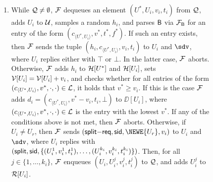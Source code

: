 \begin{figure*}[!t]
{{\begin{enumerate}
	
	\item While $\mathcal{Q} \neq \emptyset$, $\mathcal{F}$ dequeues an element $(U^*,U_i,v_i,t_i)$ from $\mathcal{Q}$, 
	adds $U_i$ to $\mathcal{U}$, samples a random $h_i$, and parses $\mathsf{B}$ via $\mathcal{F}_{\mathsf{B}}$ for an entry 
	of the form $(c_{\langle U^*,U_i \rangle}, v^*, t^*, f^*)$. If such an entry exists, then 
	$\mathcal{F}$ sends the tuple $(h_i, c_{\langle U^*,U_i \rangle}, v_i, t_i)$ to $U_i$ and $\sdv$, 
	where $U_i$ replies either with $\top$ or $\bot$.  In the latter case, $\mathcal{F}$ aborts. 
	Otherwise, $\mathcal{F}$ adds $h_i$ to $\mathcal{H}[U^*]$ and $\mathcal{H}[U_i]$, sets $\mathcal{V}[U_i] = \mathcal{V}[U_i] + v_i$, 
	and checks whether for all entries of the form $(c_{\langle U^*,U_i \rangle}, v^*, \cdot, 
	\cdot) \in \mathcal{L}$, it holds that $v^* \geq v_i$. If this is the case $\mathcal{F}$ adds 
	$d_i = (c_{\langle U^*,U_i \rangle},v^* - v_i, t_i, \bot)$ to $\DD[U_i]$, where 
	$(c_{\langle U^*,U_i \rangle}, v^*, \cdot, \cdot) \in \mathcal{L}$ is the entry with the lowest 
	$v^*$. If any of the conditions above is not met, then $\mathcal{F}$ aborts. Otherwise, if 
	$U_i \neq U_r$, then $\mathcal{F}$ sends $(\mathsf{split-}\mathsf{req}, \sid, \NEWE{U_r}, v_i)$ 
	to $U_i$ and $\sdv$, where $U_i$ replies with $(\mathsf{split}, \mathsf{sid}, \{(U_i^1,v_i^1,t_i^1),
	\ldots,(U_i^{k_i},v_i^{k_i},t_i^{k_i})\})$. Then, for all $j \in \{1,\ldots,k_i\}$, $\mathcal{F}$ 
	enqueues $(U_i,U_i^j,v_i^j,t_i^j)$ to $\mathcal{Q}$, and adds $U_i^j$ to $\mathcal{R}[U_i]$.
	

\end{enumerate}}}
\end{figure*}
